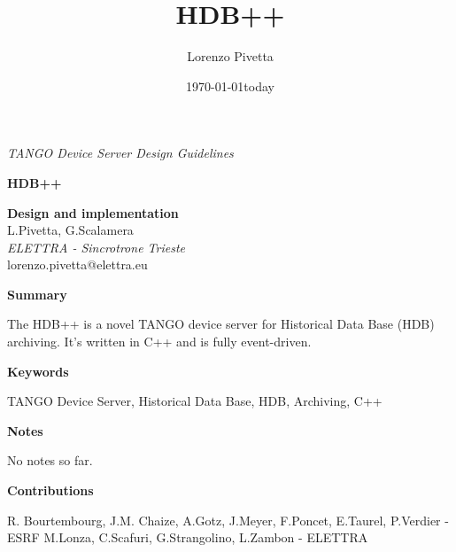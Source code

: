 \documentclass[11pt,a4paper]{article}
\title{HDB++}
\author{Lorenzo Pivetta}
\date{\today}
\def \hdb{HDB++}
\def \tango{TANGO}
\begin{document}

\thispagestyle{empty}
\begin{center}
	\hspace{1.5cm}
	\emph{\tango{} Device Server Design Guidelines}
	\vspace{2cm}
	\newline
	\begin{LARGE}
		\textbf{\hdb} \\
	\end{LARGE}
	\vspace{1cm}
	\textbf{Design and implementation} \\
	\vspace{2cm}
	L.Pivetta, G.Scalamera \\
	\emph{ELETTRA - Sincrotrone Trieste} \\
	\vspace{1cm}
	lorenzo.pivetta@elettra.eu \\
	\date{today}
\end{center}

\newpage

\begin{Large}
	\textbf{Summary}
\end{Large}
\newline
The \hdb{} is a novel \tango{} device server for Historical Data Base
(HDB) archiving. It's written in C++ and is fully event-driven.
\vspace{2cm}

\begin{Large}
	\textbf{Keywords}
\end{Large}
\newline
\tango{} Device Server, Historical Data Base, HDB, Archiving, C++
\vspace{2cm}
	
\begin{Large}
	\textbf{Notes}
\end{Large}
\newline
No notes so far.
\vspace{2cm}

\begin{Large}
	\textbf{Contributions}
\end{Large}
\newline
R. Bourtembourg, J.M. Chaize, A.Gotz, J.Meyer, F.Poncet, E.Taurel, P.Verdier - ESRF
\newline
M.Lonza, C.Scafuri, G.Strangolino, L.Zambon - ELETTRA
\vspace{2cm}
\end{document}
